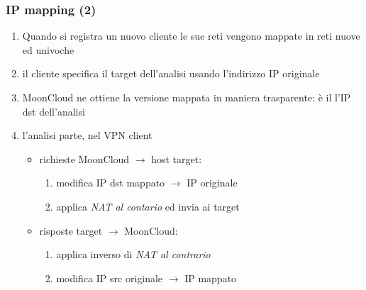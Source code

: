 \begin{frame}
	\frametitle{IP mapping (2)}
	\begin{enumerate}
		\item Quando si registra un nuovo cliente le sue reti vengono \alert{mappate}
		      in reti nuove ed univoche
		      		      
		\item il cliente specifica il target dell'analisi usando l'indirizzo IP originale
		      		              
		\item MoonCloud ne ottiene la \alert{versione mappata} in maniera
		      \alert{trasparente}: è il l'IP dst dell'analisi
		      		      
		\item l'analisi parte, nel \alert{VPN client}
		      \begin{itemize}
		      	\item richieste MoonCloud $\rightarrow$ host target:
		      	      \begin{enumerate}
		      	      	\item modifica IP dst mappato $\rightarrow$ IP originale
		      	      	\item applica \textit{NAT al contario} ed invia ai target
		      	      \end{enumerate}
		      	\item risposte target $\rightarrow$ MoonCloud:
		      	      \begin{enumerate}
		      	      	\item applica inverso di \textit{NAT al contrario}
		      	      	\item modifica IP src originale $\rightarrow$ IP mappato
		      	      \end{enumerate}
		      \end{itemize}
		      		      
	\end{enumerate}
		
\end{frame}

